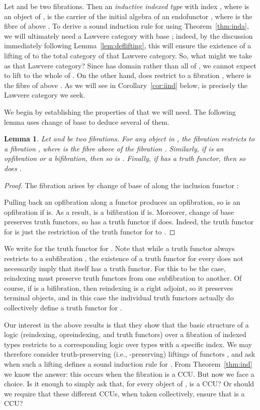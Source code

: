 \documentclass{LMCS}
\theoremstyle{plain}
\newtheorem{lemma}[theorem]{Lemma}
\theoremstyle{remark}
\theoremstyle{definition}
\begin{document}
Let  and  be two fibrations. Then an
{\em inductive indexed type} with index , where  is an object of
, is the carrier  of the initial algebra of an endofunctor
, where  is the fibre of  above . To
derive a sound induction rule for  using
Theorem~\ref{thm:inda}, we will ultimately need a Lawvere category
with base ; indeed, by the discussion immediately following
Lemma~\ref{lem:deflifting}, this will ensure the existence of a
lifting of  to the total category of that Lawvere category. So,
what might we take as that Lawvere category? Since  has domain
 rather than all of , we cannot expect  to lift to the
whole of . On the other hand,  does restrict to a fibration
, where  is the fibre of  above .  As
we will see in Corollary~\ref{cor:iind} below,  is precisely the
Lawvere category we seek.

We begin by establishing the properties of  that we will
need. The following lemma uses change of base to deduce several of
them.

\begin{lemma}\label{lem:fibredfib}
  Let  and  be two fibrations. For any object
   in , the fibration  restricts to a fibration
  , where  is the fibre above  of the
  fibration . Similarly, if  is an opfibration or a
  bifibration, then so is . Finally, if  has a truth functor,
  then so does .
\end{lemma}
\begin{proof}
  The fibration  arises by change of base of 
  along the inclusion functor :
 
Pulling back an opfibration along a functor produces an opfibration,
so  is an opfibration if  is. As a result,  is a
bifibration if  is. Moreover, change of base preserves truth
functors, so  has a truth functor if  does. Indeed, the truth
functor for  is just the restriction of the truth functor for 
to .
\end{proof}
\noindent
We write  for the truth functor for . Note that while a
truth functor always restricts to a subfibration , the existence
of a truth functor  for every  does not necessarily imply
that  itself has a truth functor. For this to be the case,
reindexing must preserve truth functors from one subfibration to
another. Of course, if  is a bifibration, then reindexing is a
right adjoint, so it preserves terminal objects, and in this case the
individual truth functors  actually do collectively define a
truth functor for .

Our interest in the above results is that they show that the basic
structure of a logic (reindexing, opreindexing, and truth functors)
over a fibration of indexed types restricts to a corresponding logic
over types with a specific index. We may therefore consider
truth-preserving (i.e., -preserving) liftings of functors , and ask when such a lifting defines a sound induction rule
for .  From Theorem~\ref{thm:ind} we know the answer: this
occurs when the fibration  is a CCU. But now we
face a choice. Is it enough to simply ask that, for every object 
of ,  is a CCU? Or should we require that these different
CCUs, when taken collectively, ensure that  is a CCU?
\end{document}
